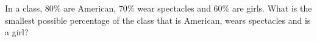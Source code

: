 In a class, $80\%$ are American, $70\%$ wear spectacles and $60\%$ are girls. What is the smallest possible percentage of the class that is American, wears spectacles and is a girl?
